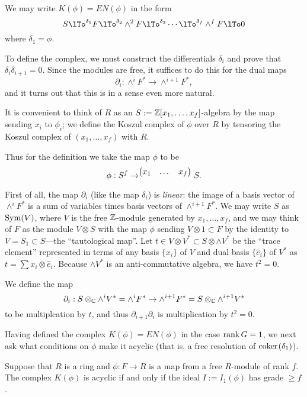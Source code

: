 We may write
$K(\phi) = EN(\phi)$ in the form
$$
S \lTo^{\delta_{1}} F \lTo^{\delta_{2}} \wedge^{2}F \lTo^{\delta_{3}} \cdots \lTo^{\delta_{f}} \wedge^{f}F \lTo 0
$$
where $\delta_{1} = \phi$.

To define the complex, we must construct the differentials $\delta_{i}$ and prove that
$\delta_{i}\delta_{i+1} = 0$. Since the modules are free, it suffices to do this for the 
dual maps 
$$
\partial_{i}: \wedge^{i}F^{*} \to \wedge^{i+1}F^{*},
$$
and it turns out that this is in a sense even more natural. 

It is convenient to think of $R$ as an $S := {\mathbb Z}[x_{1},\dots, x_{f}]$-algebra by the map sending 
$x_{i}$ to $\phi_{i}$; we  define the Koszul complex of $\phi$ over $R$ by tensoring
the Koszul complex of $(x_{1}, \dots, x_{f})$ with $R$.

Thus for the definition we take the map $\phi$ to be 
$$
\phi: S^{f}\to^{
\begin{pmatrix}
x_{1} &\dots & x_{f}
\end{pmatrix}
} S.
$$

First of all, the map $\partial_{i}$ (like the map $\delta_{i}$) is \emph{linear}: the image of a basis vector of $\wedge^{i}F^{*} $ is a sum of variables times basis vectors
of $\wedge^{i+1}F^{*}$. We may write $S$ as $\operatorname{Sym}(V)$, where $V$ is the free ${\mathbb Z}$-module generated by $x_{1}, \dots, x_{f}$, and we may think of $F$ as the module $V\otimes S$ with the map
$\phi$ sending $V\otimes 1\subset F$ by the identity to $V = S_{1}\subset S$---the ``tautological map''. 
Let $t\in V\otimes V^{*}\subset S\otimes \wedge V^{*}$ be the ``trace element'' represented in terms of any basis $\{x_{i}\}$ of $V$
and dual basis $\{\hat e_{i}\}$ of $V^{*}$ as $t = \sum x_{i}\otimes \hat e_{i}$. Because $\wedge V^{*}$ is 
an anti-commutative algebra, we have $t^{2} = 0$.

We define the map 
$$
\partial_{i}: S\otimes_{{\mathbb C}} \wedge^{i}V^{*} = \wedge^{i}F^{*}  \to \wedge^{i+1}F^{*} = S\otimes_{{\mathbb C}} \wedge^{i+1}V^{*}
$$
to be multiplcation by $t$, and thus $\partial_{i+1}\partial_{i}$ is multiplication by $t^{2} = 0$.

Having defined the complex $K(\phi) = EN(\phi)$ in the case $\operatorname{rank} G = 1$, we next ask what conditions on $\phi$
make it acyclic (that is, a free resolution of ${\rm{coker}\kern1pt} (\delta_{1})$). 

\begin{theorem}\label{rankG1}
 Suppose that $R$ is a ring and $\phi: F\to R$ is a map from a free $R$-module of rank $f$.
 The complex $K(\phi)$ is acyclic if and only if the ideal $I := I_{1}(\phi)$ has grade $\geq f$.
 \end{theorem}

